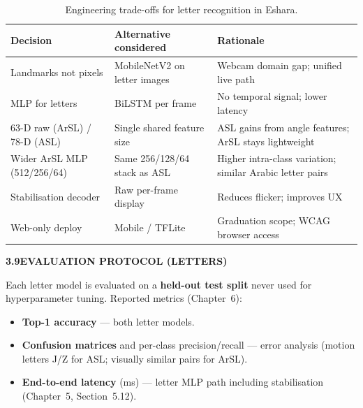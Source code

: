 \begin{table}[H]
\centering
\caption{Engineering trade-offs for letter recognition in Eshara.}
\label{tab:ch3-tradeoffs}
\footnotesize %
\begin{tabular}{|p{}|p{}|p{}|}
\hline
\textbf{Decision} & \textbf{Alternative considered} & \textbf{Rationale} \\ \hline
Landmarks not pixels & MobileNetV2 on letter images & Webcam domain gap; unified live path \\ \hline
MLP for letters & BiLSTM per frame & No temporal signal; lower latency \\ \hline
63-D raw (ArSL) / 78-D (ASL) & Single shared feature size & ASL gains from angle features; ArSL stays lightweight \\ \hline
Wider ArSL MLP (512/256/64) & Same 256/128/64 stack as ASL & Higher intra-class variation; similar Arabic letter pairs \\ \hline
Stabilisation decoder & Raw per-frame display & Reduces flicker; improves UX \\ \hline
Web-only deploy & Mobile / TFLite & Graduation scope; WCAG browser access \\ \hline
\end{tabular}
\end{table}
\vspace{0.2cm} %
\clearpage
\noindent\textbf{3.9\quad EVALUATION PROTOCOL (LETTERS)}\par
{}
\vspace{0.2cm} %

\noindent Each letter model is evaluated on a \textbf{held-out test split} never used for hyperparameter tuning. Reported metrics (Chapter~6):
\vspace{-0.1cm} %
\begin{itemize}
\setlength{\itemsep}{0pt} %
\setlength{\parskip}{0pt}
\item \textbf{Top-1 accuracy} --- both letter models.
\item \textbf{Confusion matrices} and per-class precision/recall --- error analysis (motion letters J/Z for ASL; visually similar pairs for ArSL).
\item \textbf{End-to-end latency} (ms) --- letter MLP path including stabilisation (Chapter~5, Section~5.12).
\end{itemize}
\vspace{0.2cm} %


